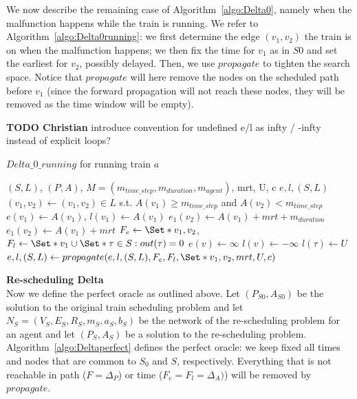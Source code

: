 \documentclass{article}
\begin{document}
We now describe the remaining case of Algorithm~\ref{algo:Delta0}, namely when the malfunction happens while the train is running. We refer to Algorithm~\ref{algo:Delta0running}: we first determine the edge $(v_1,v_2)$ the train is on when the malfunction happens; we then fix the time for $v_1$ as in $S0$ and set the earliest for $v_2$, possibly delayed. Then, we use $propagate$ to tighten the search space. Notice that $propagate$ will here remove the nodes on the scheduled path before $v_1$ (since the forward propagation will not reach these nodes, they will be removed as the time window will be empty).


\begin{mdframed}
{\bf TODO Christian} introduce convention for undefined e/l as infty / -infty instead of explicit loops?
\end{mdframed}

\begin{algorithm}
	\caption{$Delta\_0\_running$ for running train $a$} \label{algo:Delta0running}
	\begin{algorithmic}[1]
		\Require $(S,L)$, $(P,A)$, $M=(m_{time\_step},m_{duration},m_{agent})$, mrt, U, c
	    \Ensure $e,l,(S,L)$
	    \State $(v_1,v_2) \leftarrow (v_1,v_2) \in L$ s.t. $A(v_1)\geq m_{time\_step}$ and $A(v_2)<m_{time\_step}$
		\State $e(v_1)\leftarrow A(v_1)$, $l(v_1) \leftarrow A(v_1)$
            \State $e_1(v_2) \leftarrow A(v_1)+mrt+m_{duration}$
        \Else
            \State $e_1(v_2) \leftarrow A(v_1)+mrt$
        \EndIf
        \State $F_e \leftarrow \Set*{v_1,v_2}$, $F_l \leftarrow \Set*{v_1} \cup \Set*{\tau \in S: out(\tau)=0}$
	        \State $e(v) \leftarrow \infty$
	    \EndFor
	        \State $l(v) \leftarrow -\infty$
	    \EndFor
	        \State $l(\tau) \leftarrow U$
	    \EndFor
		\State $e,l,(S,L) \leftarrow propagate(e,l,(S,L),F_e,F_l, \Set*{v_1,v_2}, mrt, U, c)$
	\end{algorithmic}
\end{algorithm}







\noindent\textbf{Re-scheduling Delta}
\\
Now we define the perfect oracle as outlined above.
Let $(P_{S0},A_{S0})$ be the solution to the original train scheduling problem
and let $N_S=(V_S,E_S,R_S,m_S,a_S,b_S)$ be the network of the re-scheduling problem for an agent
and  let $(P_S,A_S)$ be a solution to the re-scheduling problem. Algorithm~\ref{algo:Deltaperfect} defines the perfect oracle: we keep fixed all times and nodes that are common to $S_0$ and $S$, respectively. Everything that is not reachable in path ($F=\Delta_P$) or time ($F_e=F_l=\Delta_A)$) will be removed by $propagate$.
\end{document}
